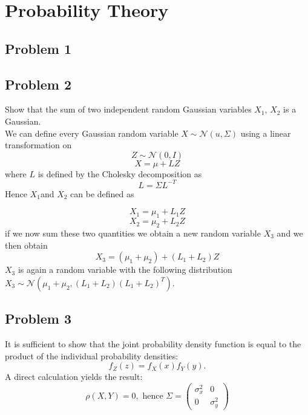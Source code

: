 \section{Probability Theory}


\subsection*{Problem 1}


\subsection*{Problem 2}

Show that the sum of two independent random Gaussian variables $X_{1}$,
$X_{2}$ is a Gaussian. \\
We can define every Gaussian random variable $X\sim\mathcal{N}(u,\Sigma)$
using a linear transformation on 
\[
Z\sim\mathcal{N}(0,I)
\]
\[
X=\mu+LZ
\]
 where $L$ is defined by the Cholesky decomposition as 
 \[
 L=\Sigma L^{-T}
 \]
 Hence $X_{1}$and $X_{2}$ can be defined as

 \[
 X_{1}=\mu_{1}+L_{1}Z
 \]
 \[
 X_{2}=\mu_{2}+L_{2}Z
 \]
  if we now sum these two quantities we obtain a new random variable
      $X_{3}$ and we then obtain
      \[
      X_{3}=(\mu_{1}+\mu_{2})+(L_{1}+L_{2})Z
      \]
       $X_{3}$ is again a random variable with the following distribution
       $X_{3}\sim\mathcal{N}(\mu_{1}+\mu_{2},(L_{1}+L_{2})(L_{1}+L_{2})^{T})$.

\subsection*{Problem 3}

It is sufficient to show that the joint probability density function is equal to the product 
of the individual probability densities:
\[
    f_{Z}(z) = f_X(x)f_Y(y).
\]
A direct calculation yields the result:
\[
    \rho(X,Y) = 0, \textrm{ hence } \Sigma = \begin{pmatrix}
                                               \sigma_x^2 & 0   \\
                                               0          & \sigma_y^2
                                             \end{pmatrix}
\]

